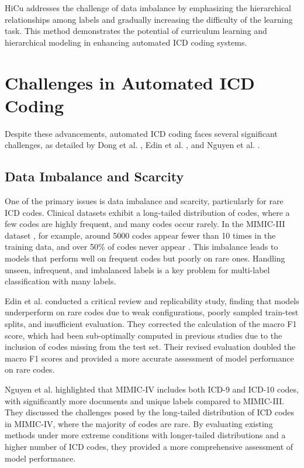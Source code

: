 \documentclass[12pt,a4paper]{report}
\begin{document}
HiCu addresses the challenge of data imbalance by emphasizing the hierarchical relationships among labels and gradually increasing the difficulty of the learning task. This method demonstrates the potential of curriculum learning and hierarchical modeling in enhancing automated ICD coding systems.

\section{Challenges in Automated ICD Coding}

Despite these advancements, automated ICD coding faces several significant challenges, as detailed by Dong et al. \cite{dong2022automated}, Edin et al. \cite{edin2023automated}, and Nguyen et al. \cite{nguyen2023mimic}.

\subsection{Data Imbalance and Scarcity}

One of the primary issues is data imbalance and scarcity, particularly for rare ICD codes. Clinical datasets exhibit a long-tailed distribution of codes, where a few codes are highly frequent, and many codes occur rarely. In the MIMIC-III dataset \cite{johnson2016mimic}, for example, around 5000 codes appear fewer than 10 times in the training data, and over 50\% of codes never appear \cite{rios2018few}. This imbalance leads to models that perform well on frequent codes but poorly on rare ones. Handling unseen, infrequent, and imbalanced labels is a key problem for multi-label classification with many labels.

Edin et al. \cite{edin2023automated} conducted a critical review and replicability study, finding that models underperform on rare codes due to weak configurations, poorly sampled train-test splits, and insufficient evaluation. They corrected the calculation of the macro F1 score, which had been sub-optimally computed in previous studies due to the inclusion of codes missing from the test set. Their revised evaluation doubled the macro F1 scores and provided a more accurate assessment of model performance on rare codes.

Nguyen et al. \cite{nguyen2023mimic} highlighted that MIMIC-IV includes both ICD-9 and ICD-10 codes, with significantly more documents and unique labels compared to MIMIC-III. They discussed the challenges posed by the long-tailed distribution of ICD codes in MIMIC-IV, where the majority of codes are rare. By evaluating existing methods under more extreme conditions with longer-tailed distributions and a higher number of ICD codes, they provided a more comprehensive assessment of model performance.
\end{document}
